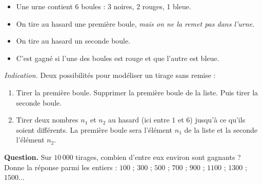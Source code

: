 \documentclass[class=report,crop=false, 12pt]{standalone}
\begin{document}
\begin{enigme}

\sauteligne

\begin{itemize}
  \item Une urne contient $6$ boules : 3 noires, 2 rouges, 1 bleue.
  \item On tire au hasard une première boule, \emph{mais on ne la remet pas dans l'urne}.
  \item On tire au hasard un seconde boule.
  \item C'est gagné si l'une des boules est rouge et que l'autre est bleue.
\end{itemize}

\bigskip

\emph{Indication.} Deux possibilités pour modéliser un tirage sans remise : 
\begin{enumerate}
  \item Tirer la première boule. Supprimer la première boule de la liste. Puis tirer la seconde boule.
  
  \item Tirer deux nombres $n_1$ et $n_2$ au hasard (ici entre $1$ et $6$) jusqu'à ce qu'ils soient différents. La première boule sera l'élément $n_1$ de la liste et la seconde l'élément $n_2$.
\end{enumerate}
  

\bigskip

\textbf{Question.} Sur $10\,000$ tirages, combien d'entre eux environ sont gagnants ?
Donne la réponse parmi les entiers :
$100$ ; $300$ ; $500$ ; $700$ ; $900$ ; $1 100$ ; $1 300$ ; $1 500$...



\end{enigme}
\end{document}
